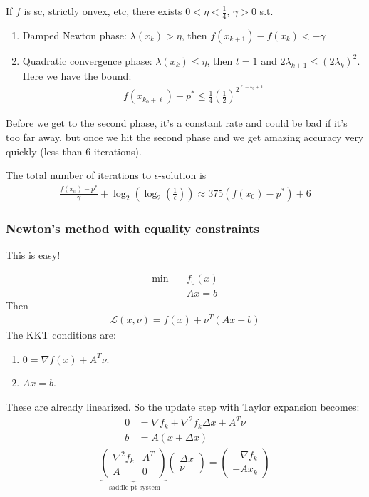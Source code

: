 \documentclass[class=article,crop=false]{standalone}
\begin{document}
\begin{thm}
If $ f$ is sc, strictly onvex, etc, there exists  $ 0< \eta < \frac{1}{4}$, $ \gamma > 0$ s.t. 
\begin{enumerate}[label=(\roman*)]
	\item Damped Newton phase: $ \lambda(x_k)> \eta$, then $ f(x_{k+1}) - f(x_k) < -\gamma$
	\item Quadratic convergence phase: $ \lambda(x_k) \leq \eta$, then $ t=1$ and  $ 2 \lambda_{k+1} \leq (2\lambda_k)^2$. Here we have the bound:
		\begin{align*}
			f(x_{k_0+\ell})-p^* \leq \frac{1}{4} \left( \frac{1}{2} \right) ^{2^{\ell-k_0+1}}
		\end{align*}
\end{enumerate}
\end{thm}
\begin{note}
	Before we get to the second phase, it's a constant rate and could be bad if it's too far away, but once we hit the second phase and we get amazing accuracy very quickly (less than 6 iterations).
\end{note}
The total number of iterations to $ \epsilon$-solution is
\begin{align*}
	\frac{f(x_0)-p^* }{ \gamma}+ \log_2 \left( \log_2 \left( \frac{1}{ \epsilon} \right)  \right) \approx 375(f(x_0)-p^* ) + 6
\end{align*}

\subsubsection{Newton's method with equality constraints}
This is easy!

\begin{align*}
\min\quad &f_0(x) \\
&Ax=b
\end{align*}
Then
\begin{align*}
	\mathscr{L}(x,\nu) = f(x) + \nu^{T}(Ax-b)
\end{align*}
The KKT conditions are:
\begin{enumerate}[label=(\arabic*)]
	\item $ 0=\nabla f(x) + A^{T} \nu$.
	\item $ Ax=b$.
\end{enumerate}
These are already linearized. So the update step with Taylor expansion becomes:
\begin{align*}
	0&= \nabla f_k + \nabla ^2 f_k \Delta x + A^{T} \nu \\
	b&= A(x+ \Delta x)
\end{align*}
\begin{align*}
	\underbrace{ \begin{pmatrix} \nabla ^2 f_k& A^{T}\\A&0 \end{pmatrix}  }_{ \text{ saddle pt system}}\begin{pmatrix} \Delta x\\ \nu \end{pmatrix} = \begin{pmatrix} -\nabla f_k \\ -A x_k \end{pmatrix}   
\end{align*}
\end{document}
